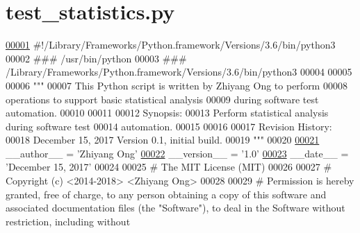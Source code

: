 \hypertarget{test__statistics_8py_source}{}\section{test\+\_\+statistics.\+py}
\label{test__statistics_8py_source}

\begin{DoxyCode}
\hypertarget{test__statistics_8py_source_l00001}{}\hyperlink{namespacestatistics_1_1test__statistics}{00001} \textcolor{comment}{#!/Library/Frameworks/Python.framework/Versions/3.6/bin/python3}
00002 \textcolor{comment}{### /usr/bin/python}
00003 \textcolor{comment}{### /Library/Frameworks/Python.framework/Versions/3.6/bin/python3}
00004 
00005 
00006 \textcolor{stringliteral}{"""}
00007 \textcolor{stringliteral}{    This Python script is written by Zhiyang Ong to perform}
00008 \textcolor{stringliteral}{        operations to support basic statistical analysis}
00009 \textcolor{stringliteral}{        during software test automation.}
00010 \textcolor{stringliteral}{    }
00011 \textcolor{stringliteral}{    }
00012 \textcolor{stringliteral}{    Synopsis:}
00013 \textcolor{stringliteral}{    Perform statistical analysis during software test}
00014 \textcolor{stringliteral}{        automation. }
00015 \textcolor{stringliteral}{}
00016 \textcolor{stringliteral}{}
00017 \textcolor{stringliteral}{    Revision History:}
00018 \textcolor{stringliteral}{    December 15, 2017           Version 0.1, initial build.}
00019 \textcolor{stringliteral}{"""}
00020 
\hypertarget{test__statistics_8py_source_l00021}{}\hyperlink{namespacestatistics_1_1test__statistics_a188ace18635f13c413bf14347b4eb7f0}{00021} \_\_author\_\_ = \textcolor{stringliteral}{'Zhiyang Ong'}
\hypertarget{test__statistics_8py_source_l00022}{}\hyperlink{namespacestatistics_1_1test__statistics_ad5c236202b813efcbc877e38a20d7f07}{00022} \_\_version\_\_ = \textcolor{stringliteral}{'1.0'}
\hypertarget{test__statistics_8py_source_l00023}{}\hyperlink{namespacestatistics_1_1test__statistics_a271285b175d250f7888c9b41fa124abd}{00023} \_\_date\_\_ = \textcolor{stringliteral}{'December 15, 2017'}
00024 
00025 \textcolor{comment}{#   The MIT License (MIT)}
00026 
00027 \textcolor{comment}{#   Copyright (c) <2014-2018> <Zhiyang Ong>}
00028 
00029 \textcolor{comment}{#   Permission is hereby granted, free of charge, to any person obtaining a copy of this software and
       associated documentation files (the "Software"), to deal in the Software without restriction, including without
}
\end{DoxyCode}

